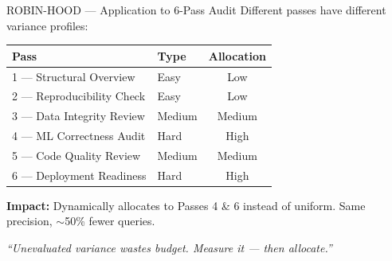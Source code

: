 \documentclass[11pt, aspectratio=169]{beamer}
\begin{document}
\begin{frame}{ROBIN-HOOD --- Application to 6-Pass Audit}
  \centering
  Different passes have different variance profiles:

  \vspace{0.15cm}
  {\footnotesize
  \begin{tabularx}{\textwidth}{l l c}
    \toprule
    \textbf{Pass} & \textbf{Type} & \textbf{Allocation} \\
    \midrule
    1 --- Structural Overview      & Easy   & Low    \\
    2 --- Reproducibility Check    & Easy   & Low    \\
    3 --- Data Integrity Review    & Medium & Medium \\
    4 --- ML Correctness Audit     & Hard   & \alert{High} \\
    5 --- Code Quality Review      & Medium & Medium \\
    6 --- Deployment Readiness     & Hard   & High \\
    \bottomrule
  \end{tabularx}
  }

  \vspace{0.15cm}
  \textbf{Impact:} Dynamically allocates to Passes 4 \& 6 instead of uniform.
  Same precision, $\sim$\alert{50\% fewer queries}.

  \vspace{0.1cm}
  {\footnotesize\emph{``Unevaluated variance wastes budget. Measure it --- then allocate.''}}
\end{frame}
\end{document}
